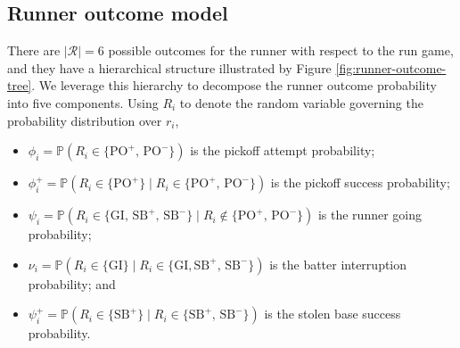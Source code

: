 \documentclass[aoas]{imsart}
\begin{document}
    \subsection{Runner outcome model}
    \label{sec:prob-runner-outcome}

      There are $|\mathcal{R}| = 6$ possible outcomes for the runner with respect to the run game, and they have a hierarchical structure illustrated by Figure \ref{fig:runner-outcome-tree}. We leverage this hierarchy to decompose the runner outcome probability into five components. Using $R_i$ to denote the random variable governing the probability distribution over $r_i$,
      \begin{itemize}
        \item $\phi_i = \mathbb{P}(R_i \in \{\mbox{PO}^+,\, \mbox{PO}^-\})$ is the pickoff attempt probability;
        \item $\phi_i^+ = \mathbb{P}(R_i \in \{\mbox{PO}^+\} \mid R_i \in \{\mbox{PO}^+,\, \mbox{PO}^-\})$ is the pickoff success probability;
        \item $\psi_i = \mathbb{P}(R_i \in \{\mbox{GI},\, \mbox{SB}^+,\, \mbox{SB}^-\} \mid R_i \notin \{\mbox{PO}^+,\, \mbox{PO}^-\})$ is the runner going probability;
        \item $\nu_i = \mathbb{P}(R_i \in \{\mbox{GI}\} \mid R_i \in \{\mbox{GI}, \mbox{SB}^+,\, \mbox{SB}^-\})$ is the batter interruption probability; and
        \item $\psi_i^+ = \mathbb{P}(R_i \in \{\mbox{SB}^+\} \mid R_i \in \{\mbox{SB}^+,\, \mbox{SB}^-\})$ is the stolen base success probability.
      \end{itemize}
\end{document}
